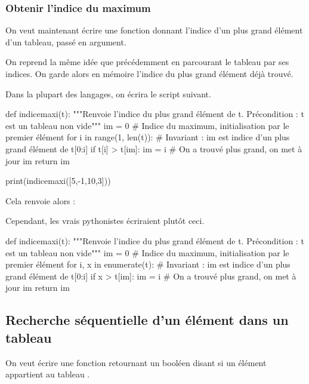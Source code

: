 \subsubsection{Obtenir l'indice du maximum}
On veut maintenant écrire une fonction  donnant l'indice d'un plus grand élément d'un tableau, passé en argument.

On reprend la même idée que précédemment en parcourant le tableau par ses indices. On garde alors 
en mémoire l'indice du plus grand élément déjà trouvé.

Dans la plupart des langages, on écrira le script suivant.
\begin{pyblock}
def indicemaxi(t):
    """Renvoie l'indice du plus grand élément de t.
       Précondition : t est un tableau non vide"""
    im = 0 # Indice du maximum, initialisation par le premier élément
    for i in range(1, len(t)):
        # Invariant : im est indice d'un plus grand élément de t[0:i]
        if t[i] > t[im]:
            im = i # On a trouvé plus grand, on met à jour im
    return im
    
print(indicemaxi([5,-1,10,3]))
\end{pyblock}

Cela renvoie alors :
\begin{quote}
  \printpythontex[verb]
\end{quote}

Cependant, les vrais pythonistes écriraient plutôt ceci. 
\begin{pyverbatim}
def indicemaxi(t):
    """Renvoie l'indice du plus grand élément de t.
       Précondition : t est un tableau non vide"""
    im = 0 # Indice du maximum, initialisation par le premier élément
    for i, x in enumerate(t):
        # Invariant : im est indice d'un plus grand élément de t[0:i]
        if x > t[im]:
            im = i # On a trouvé plus grand, on met à jour im
    return im
\end{pyverbatim}

\clearslide{}
\subsection{Recherche séquentielle d'un élément dans un tableau}

On veut écrire une fonction  retournant un booléen disant si un
élément  appartient au tableau . 

